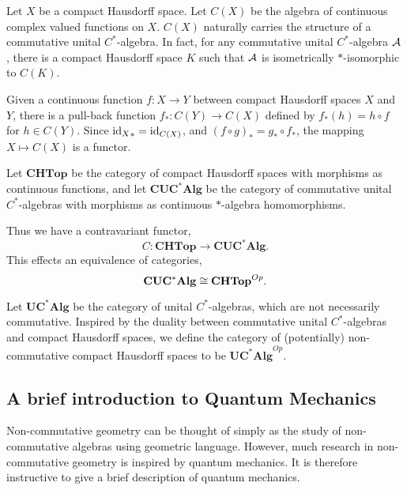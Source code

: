 \begin{example}
    Let $X$ be a compact Hausdorff space. Let $C(X)$ be the algebra
    of continuous complex valued functions on $X$. $C(X)$ naturally carries
    the structure of a commutative unital $C^*$-algebra. In fact, for any commutative
    unital $C^*$-algebra $\mathcal{A}$, there is a compact Hausdorff space $K$
    such that $\mathcal{A}$ is isometrically $*$-isomorphic to $C(K)$.
    
    Given a continuous function $f:X\rightarrow Y$ between compact Hausdorff spaces
    $X$ and $Y$, there is a pull-back function $f_*:C(Y)\rightarrow C(X)$ defined
    by $f_*(h) = h\circ f$ for $h \in C(Y)$. Since ${\operatorname{id}_X}_* = \operatorname{id}_{C(X)}$, 
    and $(f\circ g)_* = g_* \circ f_*$, the mapping $X\mapsto C(X)$
    is a functor. 
    
    Let $\mathbf{CHTop}$ be the category of compact Hausdorff spaces
    with morphisms as continuous functions, and let $\mathbf{CUC^*Alg}$
    be the category of commutative unital $C^*$-algebras with morphisms
    as continuous $*$-algebra homomorphisms.
    
    Thus we have a contravariant functor,
    \begin{equation}
        C:\mathbf{CHTop}\rightarrow \mathbf{CUC^*Alg}.
    \end{equation}
    This effects an equivalence of categories,
    \begin{equation}
        \mathbf{CUC^*Alg} \cong \mathbf{CHTop}^{Op}.
    \end{equation}
    
    Let $\mathbf{UC^*Alg}$ be the category of unital $C^*$-algebras,
    which are not necessarily commutative. Inspired by the duality between commutative
    unital $C^*$-algebras and compact Hausdorff spaces, we define
    the category of (potentially) non-commutative compact Hausdorff spaces
    to be $\mathbf{UC^*Alg}^{Op}$.
\end{example}

\subsection{A brief introduction to Quantum Mechanics}
Non-commutative geometry can be thought of simply as the study of non-commutative
algebras using geometric language. However, much research in non-commutative
geometry is inspired by quantum mechanics. It is therefore instructive to 
give a brief description of quantum mechanics. 


